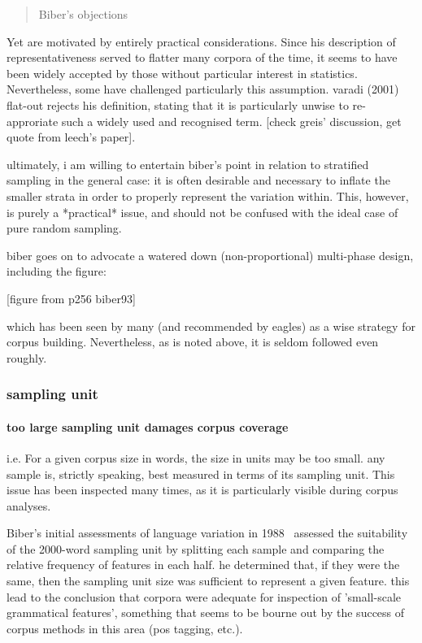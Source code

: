 \begin{quotation}
Biber's objections
\end{quotation}

Yet are motivated by entirely practical considerations. Since his description of representativeness served to flatter many corpora of the time, it seems to have been widely accepted by those without particular interest in statistics. Nevertheless, some have challenged particularly this assumption.  varadi (2001) flat-out rejects his definition, stating that it is particularly unwise to re-approriate such a widely used and recognised term.  [check greis' discussion, get quote from leech's paper].

ultimately, i am willing to entertain biber's point in relation to stratified sampling in the general case: it is often desirable and necessary to inflate the smaller strata in order to properly represent the variation within. This, however, is purely a *practical* issue, and should not be confused with the ideal case of pure random sampling.

biber goes on to advocate a watered down (non-proportional) multi-phase design, including the figure:

[figure from p256 biber93]

which has been seen by many (and recommended by eagles) as a wise strategy for corpus building. Nevertheless, as is noted above, it is seldom followed even roughly.


\subsubsection{sampling unit}

\paragraph{ too large sampling unit damages corpus coverage}
i.e. For a given corpus size in words, the size in units may be too small.
any sample is, strictly speaking, best measured in terms of its sampling unit. This issue has been inspected many times, as it is particularly visible during corpus analyses.

Biber's initial assessments of language variation in 1988~\cite{biber1988variation} assessed the suitability of the 2000-word sampling unit by splitting each sample and comparing the relative frequency of features in each half.  he determined that, if they were the same, then the sampling unit size was sufficient to represent a given feature.  this lead to the conclusion that corpora were adequate for inspection of 'small-scale grammatical features', something that seems to be bourne out by the success of corpus methods in this area (pos tagging, etc.).


